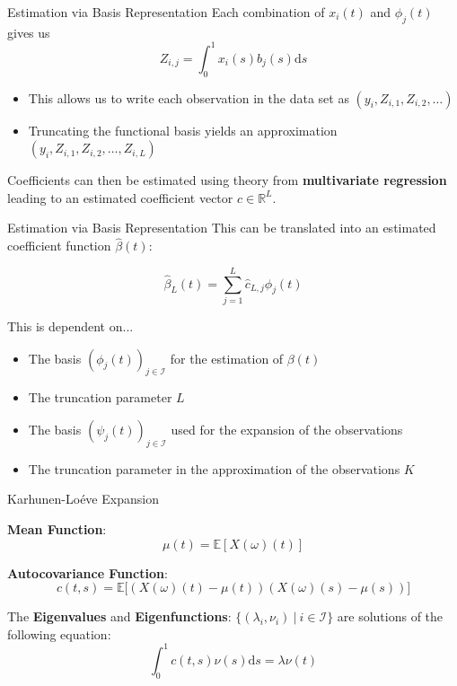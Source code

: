 \documentclass{beamer}
\begin{document}
	\begin{frame}{Estimation via Basis Representation}
		Each combination of $x_i(t)$ and $\phi_j(t)$ gives us
		$$Z_{i,j} = \int_{0}^{1} x_i(s) b_j(s)\mathrm{d}s$$
		
		\begin{itemize}
			\item This allows us to write each observation in the data set as $\left(y_i, Z_{i,1}, Z_{i,2}, \dots \right)$
			\item Truncating the functional basis yields an approximation $\left(y_i, Z_{i,1}, Z_{i,2}, \dots, Z_{i,L}\right)$
		\end{itemize}
		
		Coefficients can then be estimated using theory from \textbf{multivariate regression} leading to an estimated coefficient vector $\hat{c} \in \mathbb{R}^L$.
	\end{frame}

	\begin{frame}{Estimation via Basis Representation}
		This can be translated into an estimated coefficient function $\hat{\beta}(t)$:
		
		$$\hat{\beta}_L(t) = \sum_{j = 1}^{L} \hat{c}_{L,j} \phi_j(t)$$
	
		This is dependent on...
		\begin{itemize}
			\item The basis $(\phi_j(t))_{j \in \mathcal{I}}$ for the estimation of $\beta(t)$
			\item The truncation parameter $L$
			\item The basis $(\psi_j(t))_{j \in \mathcal{I}}$ used for the expansion of the observations
			\item The truncation parameter in the approximation of the observations $K$
		\end{itemize}
	\end{frame}
	



	\begin{frame}{Karhunen-Lo\'{e}ve Expansion}
		
		\textbf{Mean Function}: $$\mu(t) = \mathbb{E}\left[ X(\omega)(t) \right]$$

		\textbf{Autocovariance Function}: $$c(t,s) = \mathbb{E}\big[ \left( X(\omega)(t) - \mu(t) \right) \left( X(\omega)(s) - \mu(s) \right) \big]$$
		
		The \textbf{Eigenvalues} and \textbf{Eigenfunctions}: $\{(\lambda_i, \nu_i) \: \vert \: i \in \mathcal{I}\}$  are solutions of the following equation:
		$$ \int_{0}^{1}c(t,s)\nu(s) \mathrm{d}s = \lambda \nu(t) $$
	\end{frame}
	
\end{document}
